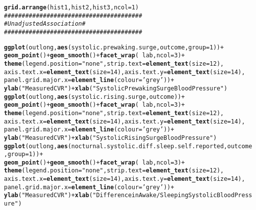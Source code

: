 \documentclass[10pt]{article}\usepackage[]{graphicx}\usepackage[]{color}
\makeatletter
\newcommand{\hlnum}[1]{\textcolor[rgb]{0.686,0.059,0.569}{#1}}%
\newcommand{\hlstr}[1]{\textcolor[rgb]{0.192,0.494,0.8}{#1}}%
\newcommand{\hlcom}[1]{\textcolor[rgb]{0.678,0.584,0.686}{\textit{#1}}}%
\newcommand{\hlopt}[1]{\textcolor[rgb]{0,0,0}{#1}}%
\newcommand{\hlstd}[1]{\textcolor[rgb]{0.345,0.345,0.345}{#1}}%
\newcommand{\hlkwc}[1]{\textcolor[rgb]{0.333,0.667,0.333}{#1}}%
\newcommand{\hlkwd}[1]{\textcolor[rgb]{0.737,0.353,0.396}{\textbf{#1}}}%
\newenvironment{kframe}{%
 \def\at@end@of@kframe{}%
 \ifinner\ifhmode%
  \def\at@end@of@kframe{\end{minipage}}%
  \begin{minipage}{\columnwidth}%
 \fi\fi%
 \def\FrameCommand##1{\hskip\@totalleftmargin \hskip-\fboxsep
 \colorbox{shadecolor}{##1}\hskip-\fboxsep
     \hskip-\linewidth \hskip-\@totalleftmargin \hskip\columnwidth}%
 \MakeFramed {\advance\hsize-\width
   \@totalleftmargin\z@ \linewidth\hsize
   \@setminipage}}%
 {\par\unskip\endMakeFramed%
 \at@end@of@kframe}
\newenvironment{knitrout}{}{} %
\makeatother
\begin{document}
\begin{knitrout}
\begin{kframe}
\begin{alltt}
\hlkwd{grid.arrange}\hlstd{(hist1, hist2, hist3,} \hlkwc{ncol} \hlstd{=} \hlnum{1}\hlstd{)}
\hlcom{#######################################}
\hlcom{#  Unadjusted Association             #}
\hlcom{#######################################}

\hlkwd{ggplot}\hlstd{(outlong,} \hlkwd{aes}\hlstd{(systolic.prewaking.surge, outcome,} \hlkwc{group}\hlstd{=}\hlnum{1}\hlstd{))} \hlopt{+}
  \hlkwd{geom_point}\hlstd{()} \hlopt{+} \hlkwd{geom_smooth}\hlstd{()} \hlopt{+} \hlkwd{facet_wrap}\hlstd{(}\hlopt{~}\hlstd{lab,} \hlkwc{ncol}\hlstd{=}\hlnum{3}\hlstd{)} \hlopt{+}
  \hlkwd{theme}\hlstd{(}\hlkwc{legend.position}\hlstd{=}\hlstr{"none"}\hlstd{,} \hlkwc{strip.text} \hlstd{=} \hlkwd{element_text}\hlstd{(}\hlkwc{size}\hlstd{=}\hlnum{12}\hlstd{),}
        \hlkwc{axis.text.x} \hlstd{=} \hlkwd{element_text}\hlstd{(}\hlkwc{size}\hlstd{=}\hlnum{14}\hlstd{),} \hlkwc{axis.text.y}  \hlstd{=} \hlkwd{element_text}\hlstd{(}\hlkwc{size}\hlstd{=}\hlnum{14}\hlstd{),}
        \hlkwc{panel.grid.major.x}\hlstd{=}\hlkwd{element_line}\hlstd{(}\hlkwc{colour}\hlstd{=}\hlstr{'grey'}\hlstd{))} \hlopt{+}
  \hlkwd{ylab}\hlstd{(}\hlstr{"Measured CVR"}\hlstd{)} \hlopt{+} \hlkwd{xlab}\hlstd{(}\hlstr{"Systolic Prewaking Surge Blood Pressure"}\hlstd{)}
\hlkwd{ggplot}\hlstd{(outlong,} \hlkwd{aes}\hlstd{(systolic.rising.surge, outcome))} \hlopt{+}
  \hlkwd{geom_point}\hlstd{()} \hlopt{+} \hlkwd{geom_smooth}\hlstd{()} \hlopt{+} \hlkwd{facet_wrap}\hlstd{(}\hlopt{~}\hlstd{lab,} \hlkwc{ncol}\hlstd{=}\hlnum{3}\hlstd{)} \hlopt{+}
  \hlkwd{theme}\hlstd{(}\hlkwc{legend.position}\hlstd{=}\hlstr{"none"}\hlstd{,} \hlkwc{strip.text} \hlstd{=} \hlkwd{element_text}\hlstd{(}\hlkwc{size}\hlstd{=}\hlnum{12}\hlstd{),}
        \hlkwc{axis.text.x} \hlstd{=} \hlkwd{element_text}\hlstd{(}\hlkwc{size}\hlstd{=}\hlnum{14}\hlstd{),} \hlkwc{axis.text.y}  \hlstd{=} \hlkwd{element_text}\hlstd{(}\hlkwc{size}\hlstd{=}\hlnum{14}\hlstd{),}
        \hlkwc{panel.grid.major.x}\hlstd{=}\hlkwd{element_line}\hlstd{(}\hlkwc{colour}\hlstd{=}\hlstr{'grey'}\hlstd{))} \hlopt{+}
  \hlkwd{ylab}\hlstd{(}\hlstr{"Measured CVR"}\hlstd{)} \hlopt{+} \hlkwd{xlab}\hlstd{(}\hlstr{"Systolic Rising Surge Blood Pressure"}\hlstd{)}
\hlkwd{ggplot}\hlstd{(outlong,} \hlkwd{aes}\hlstd{(nocturnal.systolic.diff.sleep.self.reported, outcome,} \hlkwc{group}\hlstd{=}\hlnum{1}\hlstd{))} \hlopt{+}
  \hlkwd{geom_point}\hlstd{()} \hlopt{+} \hlkwd{geom_smooth}\hlstd{()} \hlopt{+} \hlkwd{facet_wrap}\hlstd{(}\hlopt{~}\hlstd{lab,} \hlkwc{ncol}\hlstd{=}\hlnum{3}\hlstd{)} \hlopt{+}
  \hlkwd{theme}\hlstd{(}\hlkwc{legend.position}\hlstd{=}\hlstr{"none"}\hlstd{,} \hlkwc{strip.text} \hlstd{=} \hlkwd{element_text}\hlstd{(}\hlkwc{size}\hlstd{=}\hlnum{12}\hlstd{),}
        \hlkwc{axis.text.x} \hlstd{=} \hlkwd{element_text}\hlstd{(}\hlkwc{size}\hlstd{=}\hlnum{14}\hlstd{),} \hlkwc{axis.text.y}  \hlstd{=} \hlkwd{element_text}\hlstd{(}\hlkwc{size}\hlstd{=}\hlnum{14}\hlstd{),}
        \hlkwc{panel.grid.major.x}\hlstd{=}\hlkwd{element_line}\hlstd{(}\hlkwc{colour}\hlstd{=}\hlstr{'grey'}\hlstd{))} \hlopt{+}
  \hlkwd{ylab}\hlstd{(}\hlstr{"Measured CVR"}\hlstd{)} \hlopt{+} \hlkwd{xlab}\hlstd{(}\hlstr{"Difference in Awake/Sleeping Systolic Blood Pressure"}\hlstd{)}


\end{alltt}
\end{kframe}
\end{knitrout}
\end{document}
